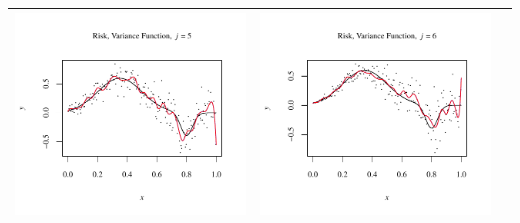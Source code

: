 \documentclass[11pt]{article}
\begin{document}
\begin{table}[h!]
\begin{center}
\begin{tabular}{| >{\centering\arraybackslash}m{2.1in} |  >{\centering\arraybackslash}m{2.1in} |  >{\centering\arraybackslash}m{2.1in}|}
      \includegraphics[width=1\linewidth,height=0.18\textheight]{Graphs/4/4/assignment5_a_4_4_5}&
      \includegraphics[width=1\linewidth,height=0.18\textheight]{Graphs/4/4/assignment5_a_4_4_6}\\\hline
    \end{tabular}
  \end{center}
\end{table}


\end{document}
